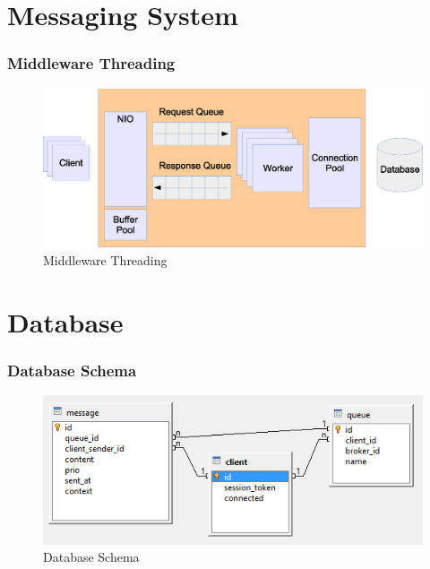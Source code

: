 \documentclass{beamer}
\begin{document}

\section{Messaging System}

\begin{frame}
\frametitle{Middleware Threading}
\begin{figure}
  \begin{center}
    \includegraphics[scale=0.4]{../../drawings/broker-threading.eps}
  \end{center}
  \caption{Middleware Threading}
  \label{fig:middleware-threading}
\end{figure}

\end{frame}



\section{Database}
\begin{frame}
\frametitle{Database Schema}

\begin{figure}
  \begin{center}
    \includegraphics[scale=0.8]{../../database/db-schema.png}
  \end{center}
  \caption{Database Schema}
  \label{fig:db-schema}
\end{figure}
\end{frame}
\end{document}

